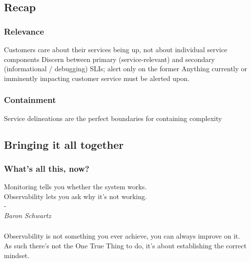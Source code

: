 \documentclass[t]{beamer}
\begin{document}
\subsection{Recap}

\begin{frame}
	\frametitle{Relevance}
	\begin{center}
		\vfill
		Customers care about their services being up, not about individual service components
		\vfill
		Discern between primary (service-relevant) and secondary (informational / debugging) SLIs; alert only on the former
		\vfill
		Anything currently or imminently impacting customer service must be alerted upon.
		\vfill
	\end{center}
\end{frame}

\begin{frame}
	\frametitle{Containment}
	\begin{center}
		\vfill
		Service delineations are the perfect boundaries for containing complexity
		\vfill
	\end{center}
\end{frame}



\subsection{Bringing it all together}

\begin{frame}
	\frametitle{What's all this, now?}
	\begin{center}
		\vfill
		Monitoring tells you whether the system works.\\
		Observability lets you ask why it’s not working.\\
		-\\
		\textit{Baron Schwartz}
		\vfill
	\end{center}
\end{frame}

\begin{frame}
	\frametitle{}
	\begin{center}
		\vfill
		Observability is not something you ever achieve, you can always improve on it.\\
		\vfill
		As such there's not the One True Thing to do, it's about establishing the correct mindset.
		\vfill
	\end{center}
\end{frame}
\end{document}
